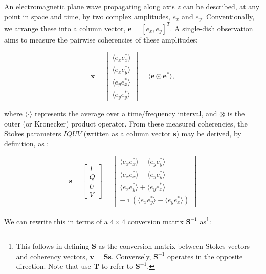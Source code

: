 An electromagnetic plane wave propagating along axis $z$ can be described, at any point in space and time, by two complex amplitudes, $e_x$ and $e_y$. 
Conventionally, we arrange these into a column vector, $\bm{e} = [e_x,e_y]^T$. A single-dish observation aims to measure the pairwise coherencies of these amplitudes:

\begin{equation}  \label{eq:pairwise}
\bm{x} = \left [ \begin{array}{c} \langle e_x e_x^* \rangle \\ \langle e_x e_y^* \rangle \\ \langle e_y e_x^* \rangle \\ \langle e_y e_y^* \rangle \end{array} \right ] =
\langle \bm{e} \circledast \bm{e}^* \rangle,
\end{equation}

\noindent where $\langle\cdot\rangle$ represents the average over a time/frequency interval, and $\otimes$ is the outer (or Kronecker) product operator.
From these measured coherencies, the Stokes parameters $IQUV$ (written as a column vector $\bm{s}$) may be derived, by definition, as \citep{1980poet.book.....B}:

\begin{equation}  \label{eq:stokes}
\bm{s} = \left [ \begin{array}{c} I \\ Q\\ U \\ V \end{array} \right ] =
\left [ \begin{array}{c} \langle e_x e_x^* \rangle + \langle e_y e_y^* \rangle \\ \langle e_x e_x^* \rangle - \langle e_y e_y^* \rangle \\
\langle e_x e_y^* \rangle + \langle e_y e_x^* \rangle \\ -\imath (\langle e_x e_y^* \rangle - \langle e_y e_x^* \rangle ) \end{array} \right ]
\end{equation}


\noindent We can rewrite this in terms of a $4\times4$ conversion matrix $\bm{S}^{-1}$ as\footnote{This follows \cite{2011A&A...527A.106S} in defining $\bm{S}$ as 
the conversion matrix between Stokes vectors and coherency vectors, $\bm{v}=\bm{Ss}$. Conversely, $\bm{S}^{-1}$ operates in the opposite direction.
Note that \cite{1996A&AS..117..137H} use $\bm{T}$ to refer to $\bm{S}^{-1}$.}:

